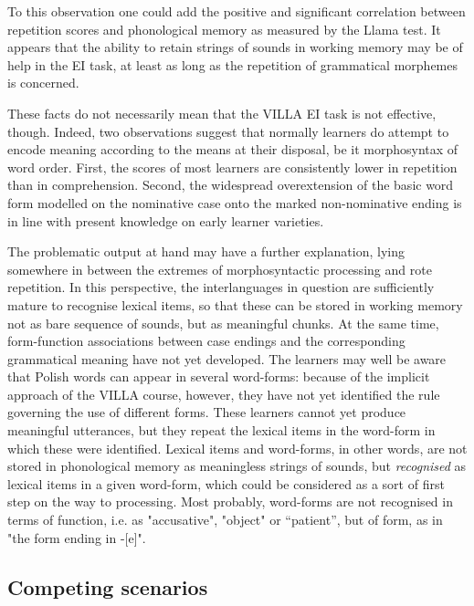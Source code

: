 To this observation one could add the positive and significant correlation between repetition scores and phonological memory as measured by the Llama test. It appears that the ability to retain strings of sounds in working memory may be of help in the EI task, at least as long as the repetition of grammatical morphemes is concerned.

These facts do not necessarily mean that the VILLA EI task is not effective, though. Indeed, two observations suggest that normally learners do attempt to encode meaning according to the means at their disposal, be it morphosyntax of word order. First, the scores of most learners are consistently lower in repetition than in comprehension. Second, the widespread overextension of the basic word form modelled on the nominative case onto the marked non-nominative ending is in line with present knowledge on early learner varieties. 

The problematic output at hand may have a further explanation, lying somewhere in between the extremes of morphosyntactic processing and rote repetition. In this perspective, the interlanguages in question are sufficiently mature to recognise lexical items, so that these can be stored in working memory not as bare sequence of sounds, but as meaningful chunks. At the same time, form-function associations between case endings and the corresponding grammatical meaning have not yet developed. The learners may well be aware that Polish words can appear in several word-forms: because of the implicit approach of the VILLA course, however, they have not yet identified the rule governing the use of different forms. These learners cannot yet produce meaningful utterances, but they repeat the lexical items in the word-form in which these were identified. Lexical items and word-forms, in other words, are not stored in phonological memory as meaningless strings of sounds, but \textit{recognised} as lexical items in a given word-form, which could be considered as a sort of first step on the way to processing. Most probably, word-forms are not recognised in terms of function, i.e. as "accusative", "object" or “patient”, but of form, as in "the form ending in -[e]".

\subsection{Competing scenarios}\label{sec:08:4.3}

